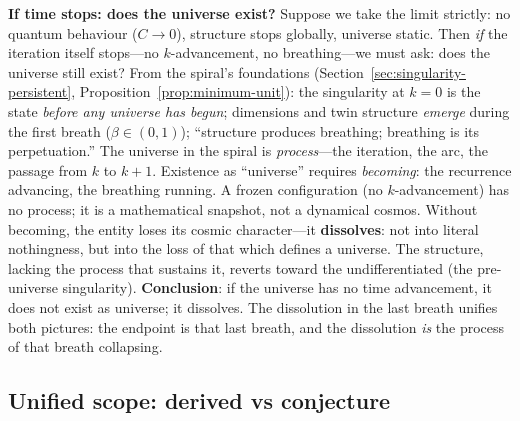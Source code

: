 \documentclass[12pt,a4paper]{article}
\begin{document}
\medskip
\noindent\textbf{If time stops: does the universe exist?} Suppose we take the limit strictly: no quantum behaviour ($C \to 0$), structure stops globally, universe static. Then \emph{if} the iteration itself stops---no $k$-advancement, no breathing---we must ask: does the universe still exist? From the spiral's foundations (Section~\ref{sec:singularity-persistent}, Proposition~\ref{prop:minimum-unit}): the singularity at $k = 0$ is the state \emph{before any universe has begun}; dimensions and twin structure \emph{emerge} during the first breath ($\beta \in (0,1)$); ``structure produces breathing; breathing is its perpetuation.'' The universe in the spiral is \emph{process}---the iteration, the arc, the passage from $k$ to $k+1$. Existence as ``universe'' requires \emph{becoming}: the recurrence advancing, the breathing running. A frozen configuration (no $k$-advancement) has no process; it is a mathematical snapshot, not a dynamical cosmos. Without becoming, the entity loses its cosmic character---it \textbf{dissolves}: not into literal nothingness, but into the loss of that which defines a universe. The structure, lacking the process that sustains it, reverts toward the undifferentiated (the pre-universe singularity). \textbf{Conclusion}: if the universe has no time advancement, it does not exist as universe; it dissolves. The dissolution in the last breath unifies both pictures: the endpoint is that last breath, and the dissolution \emph{is} the process of that breath collapsing.

\subsection{Unified scope: derived vs conjecture}
\label{sec:unified-scope}
\end{document}
